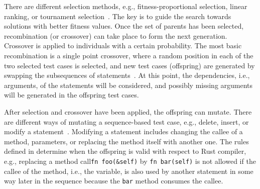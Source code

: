 \documentclass[paper=a4,%
  twoside,%
  BCOR4mm,%
  abstract=true,%
  toc=bibliography,%
  chapterprefix=true,%
  toc=bibliographynumbered,%
  open=right,%
  english,%
  pagesize=pdftex]{scrreprt}
\begin{document}
There are different selection methods, e.g., fitness-proportional selection, linear ranking, or tournament selection~\cite{McMinn_2004}. The key is to guide the search towards solutions with better fitness values. Once the set of parents has been selected, recombination (or crossover) can take place to form the next generation. Crossover is applied to individuals with a certain probability. The most basic recombination is a single point crossover, where a random position in each of the two selected test cases is selected, and new test cases (offspring) are generated by swapping the subsequences of statements~\cite{Fraser2012}. At this point, the dependencies, i.e., arguments, of the statements will be considered, and possibly missing arguments will be generated in the offspring test cases.

After selection and crossover have been applied, the offspring can mutate. There are different ways of mutating a sequence-based test case, e.g., delete, insert, or modify a statement~\cite{Fraser2012}. Modifying a statement includes changing the callee of a method, parameters, or replacing the method itself with another one. The rules defined in  determine when the offspring is valid with respect to Rust compiler, e.g., replacing a method call\texttt{fn foo(\string&self)} by \texttt{fn bar(self)} is not allowed if the callee of the method, i.e., the variable, is also used by another statement in some way later in the sequence because the \texttt{bar} method consumes the callee.
\end{document}
